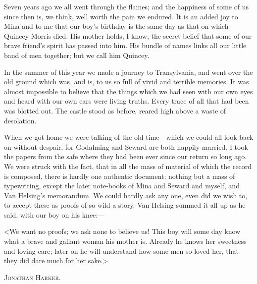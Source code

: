 
Seven years ago we all went through the flames; and the happiness of some of us since then is, we think, well worth the pain we endured. It is an added joy to Mina and to me that our boy's birthday is the same day as that on which Quincey Morris died. His mother holds, I know, the secret belief that some of our brave friend's spirit has passed into him. His bundle of names links all our little band of men together; but we call him Quincey.

In the summer of this year we made a journey to Transylvania, and went over the old ground which was, and is, to us so full of vivid and terrible memories. It was almost impossible to believe that the things which we had seen with our own eyes and heard with our own ears were living truths. Every trace of all that had been was blotted out. The castle stood as before, reared high above a waste of desolation.

When we got home we were talking of the old time—which we could all look back on without despair, for Godalming and Seward are both happily married. I took the papers from the safe where they had been ever since our return so long ago. We were struck with the fact, that in all the mass of material of which the record is composed, there is hardly one authentic document; nothing but a mass of typewriting, except the later note-books of Mina and Seward and myself, and Van Helsing's memorandum. We could hardly ask any one, even did we wish to, to accept these as proofs of so wild a story. Van Helsing summed it all up as he said, with our boy on his knee:—

<We want no proofs; we ask none to believe us! This boy will some day know what a brave and gallant woman his mother is. Already he knows her sweetness and loving care; later on he will understand how some men so loved her, that they did dare much for her sake.>

\begin{flushright}\scshape\large Jonathan Harker.\end{flushright}